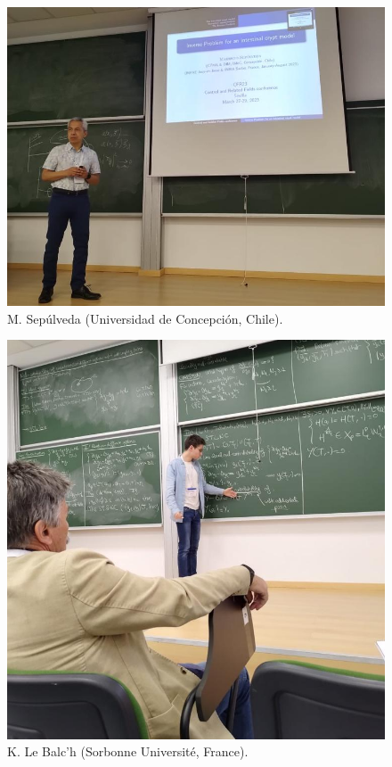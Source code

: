 \documentclass[twoside]{article}
\begin{document}
\begin{figure}[h!]
\centering
\includegraphics[width=0.7\linewidth]{images/MSepulveda}
\caption{M. Sepúlveda (Universidad de Concepción, Chile).}
\end{figure}


\begin{figure}[h!]
\centering
\includegraphics[width=0.7\linewidth]{images/Kevin}
\caption{K. Le Balc'h (Sorbonne Université, France).}
\end{figure}
\end{document}
